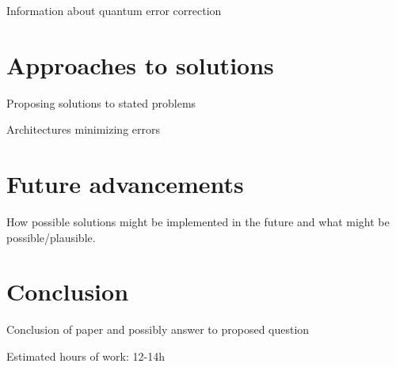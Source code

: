 Information about quantum error correction \cite{2009arXiv0904.2557G}
\section{Approaches to solutions}
Proposing solutions to stated problems

Architectures minimizing errors \cite{2009arXiv0906.2686V} \cite{2012PhRvX...2c1007J}
\section{Future advancements}
How possible solutions might be implemented in the future and what might be possible/plausible.

\section{Conclusion}
Conclusion of paper and possibly answer to proposed question

Estimated hours of work: 12-14h

\nocite{*}